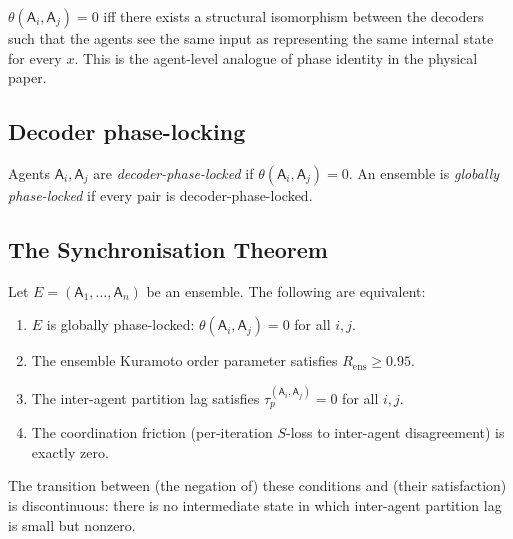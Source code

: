 \documentclass[11pt,twocolumn,a4paper]{article}
\newcommand{\agent}{\mathsf{A}}
\newcommand{\tauP}{\tau_p}
\newcommand{\Ord}{R}
\begin{document}
\begin{remark}\label{rem:sync-tens}
$\theta(\agent_i,\agent_j)=0$ iff there exists a structural isomorphism
between the decoders such that the agents see the same input as
representing the same internal state for every $x$. This is the
agent-level analogue of phase identity in the physical paper.
\end{remark}

\subsection{Decoder phase-locking}

\begin{definition}\label{def:dec-lock}
Agents $\agent_i,\agent_j$ are \emph{decoder-phase-locked} if
$\theta(\agent_i,\agent_j)=0$. An ensemble is \emph{globally
phase-locked} if every pair is decoder-phase-locked.
\end{definition}

\subsection{The Synchronisation Theorem}

\begin{theorem}\label{thm:sync}
Let $E=(\agent_1,\dots,\agent_n)$ be an ensemble. The following are
equivalent:
\begin{enumerate}[label=(\roman*),leftmargin=*]
\item $E$ is globally phase-locked: $\theta(\agent_i,\agent_j)=0$ for
all $i,j$.
\item The ensemble Kuramoto order parameter satisfies $\Ord_{\mathrm{ens}}\ge 0.95$.
\item The inter-agent partition lag satisfies $\tauP^{(\agent_i,
\agent_j)}=0$ for all $i,j$.
\item The coordination friction (per-iteration $S$-loss to inter-agent
disagreement) is exactly zero.
\end{enumerate}
The transition between (the negation of) these conditions and (their
satisfaction) is discontinuous: there is no intermediate state in which
inter-agent partition lag is small but nonzero.
\end{theorem}
\end{document}
